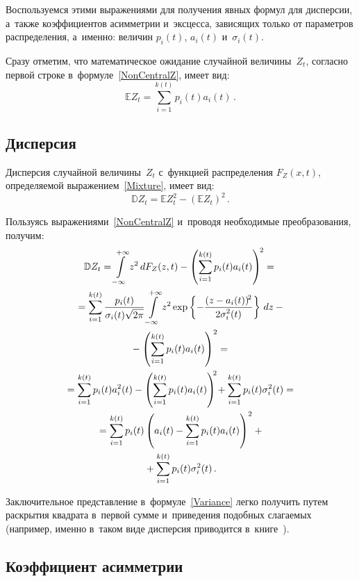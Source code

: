 \begin{multicols}{2}
Воспользуемся этими выражениями для получения явных формул для дисперсии, 
а~так\-же коэффициентов асимметрии и~эксцесса, зависящих только от параметров 
распределения, а~именно: величин $p_i(t)$, $a_i(t)$ и~$\sigma_i(t)$.

Сразу отметим, что математическое ожидание случайной величины~$Z_t$, согласно 
первой строке в~формуле~\eqref{NonCentralZ}, имеет вид:
\begin{equation}
\mathbb{E} Z_t=\sum\limits_{i=1}^{k(t)} p_i(t) a_i(t)\,. 
\label{Expectation}
\end{equation}

\subsection{Дисперсия}

Дисперсия случайной величины~$Z_t$ с~функцией распределения $F_Z(x,t)$, 
определяемой выражением~\eqref{Mixture}, имеет вид:
\begin{equation}
\mathbb{D} Z_t=\mathbb{E} Z_t^2-\left(\mathbb{E} Z_t\right)^2\,. 
\label{Var}
\end{equation}

Пользуясь выражениями~\eqref{NonCentralZ} и~проводя необходимые 
преобразования, получим:
\begin{multline}
\mathbb{D} Z_t=\int\limits_{-\infty}^{+\infty} z^2\,dF_Z(z,t)-\left(
\sum\limits_{i=1}^{k(t)} p_i(t) a_i(t)\right)^{\!2}={}
\\
{}=\sum\limits_{i=1}^{k(t)} \displaystyle\frac{\displaystyle p_i(t)\mathstrut}{\displaystyle \sigma_i(t)\sqrt{2\pi}\mathstrut} 
\int\limits_{-\infty}^{+\infty} z^2\exp\left\{-\displaystyle\frac{\displaystyle (z-a_i(t))^{\!2}\mathstrut}{\displaystyle 2\sigma_i^2(t)\mathstrut}\right\} \,dz-{}\\
{}-\left(\sum_{i=1}^{k(t)} p_i(t) a_i(t)\right)^2={}\\
{}=\sum\limits_{i=1}^{k(t)} p_i(t) a_i^2(t)-\left(\sum\limits_{i=1}^{k(t)} 
p_i(t) a_i(t)\right)^{\!\!2}\!+\sum\limits_{i=1}^{k(t)} p_i(t) \sigma_i^2(t) ={}\\
{}=\sum\limits_{i=1}^{k(t)} p_i(t) \left(a_i(t)-\sum\limits_{i=1}^{k(t)} 
p_i(t) a_i(t)\right)^2+{}\\
{}+\sum_{i=1}^{k(t)} p_i(t) \sigma_i^2(t)\,. 
\label{Variance}
\end{multline}

Заключительное представление в~формуле~\eqref{Variance} легко получить 
путем раскрытия квадрата в~первой сумме и~приведения подобных слагаемых 
(например, именно в~таком виде дисперсия приводится в~книге~\cite{Korolev2011}).

\subsection{Коэффициент асимметрии}


\end{multicols}
